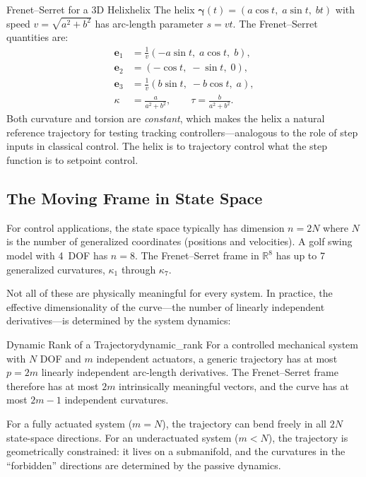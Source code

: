 \documentclass[12pt, openany]{book}
\theoremstyle{plain}
\newcommand{\traj}{\bm{\gamma}}
\newcommand{\Reals}{\mathbb{R}}
\newcommand{\tangent}{\bm{e}_1}
\newcommand{\normal}{\bm{e}_2}
\newcommand{\binormal}{\bm{e}_3}
\begin{document}
\begin{example}{Frenet--Serret for a 3D Helix}{helix}
  The helix $\traj(t) = (a\cos t,\; a\sin t,\; bt)$ with speed
  $v = \sqrt{a^2 + b^2}$ has arc-length parameter $s = vt$. The Frenet--Serret
  quantities are:
  \begin{align}
    \tangent &= \frac{1}{v}(-a\sin t,\; a\cos t,\; b), \\
    \normal &= (-\cos t,\; -\sin t,\; 0), \\
    \binormal &= \frac{1}{v}(b\sin t,\; -b\cos t,\; a), \\
    \kappa &= \frac{a}{a^2 + b^2}, \qquad
    \tau = \frac{b}{a^2 + b^2}.
  \end{align}
  Both curvature and torsion are \emph{constant}, which makes the helix a
  natural reference trajectory for testing tracking controllers---analogous to
  the role of step inputs in classical control. The helix is to trajectory
  control what the step function is to setpoint control.
\end{example}

\subsection{The Moving Frame in State Space}

For control applications, the state space typically has dimension $n = 2N$ where
$N$ is the number of generalized coordinates (positions and velocities). A golf
swing model with 4~DOF has $n = 8$. The Frenet--Serret frame in $\Reals^8$
has up to 7 generalized curvatures, $\kappa_1$ through $\kappa_7$.

Not all of these are physically meaningful for every system. In practice, the
effective dimensionality of the curve---the number of linearly independent
derivatives---is determined by the system dynamics:

\begin{principle}{Dynamic Rank of a Trajectory}{dynamic_rank}
  For a controlled mechanical system with $N$ DOF and $m$ independent actuators,
  a generic trajectory has at most $p = 2m$ linearly independent arc-length
  derivatives. The Frenet--Serret frame therefore has at most $2m$ intrinsically
  meaningful vectors, and the curve has at most $2m - 1$ independent curvatures.

  For a fully actuated system ($m = N$), the trajectory can bend freely in all
  $2N$ state-space directions. For an underactuated system ($m < N$), the
  trajectory is geometrically constrained: it lives on a submanifold, and the
  curvatures in the ``forbidden'' directions are determined by the passive
  dynamics.
\end{principle}
\end{document}

